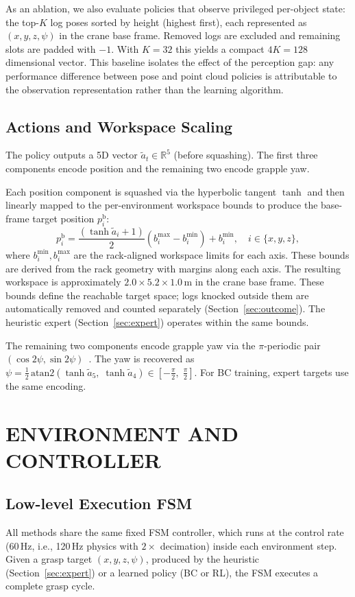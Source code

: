 \documentclass[letterpaper, 10 pt, conference]{ieeeconf}
\begin{document}
As an ablation, we also evaluate policies that observe privileged per-object state: the top-$K$ log poses sorted by height (highest first), each represented as $(x,y,z,\psi)$ in the crane base frame.
Removed logs are excluded and remaining slots are padded with $-1$.
With $K\!=\!32$ this yields a compact $4K = 128$ dimensional vector.
This baseline isolates the effect of the perception gap: any performance difference between pose and point cloud policies is attributable to the observation representation rather than the learning algorithm.

\subsection{Actions and Workspace Scaling}
\label{sec:actions}
The policy outputs a 5D vector $\tilde{a}_t \in \mathbb{R}^5$ (before squashing).
The first three components encode position and the remaining two encode grapple yaw.

Each position component is squashed via the hyperbolic tangent $\tanh$ and then linearly mapped to the per-environment workspace bounds to produce the base-frame target position $p^{\mathrm{b}}_i$:
\begin{equation}
    p^{\mathrm{b}}_i = \frac{(\tanh \tilde{a}_i + 1)}{2}(b_i^{\max} - b_i^{\min}) + b_i^{\min}, \quad i \in \{x,y,z\},
\end{equation}
where $b_i^{\min}, b_i^{\max}$ are the rack-aligned workspace limits for each axis.
These bounds are derived from the rack geometry with margins along each axis.
The resulting workspace is approximately $2.0 \times 5.2 \times 1.0$\,m in the crane base frame.
These bounds define the reachable target space; logs knocked outside them are automatically removed and counted separately (Section~\ref{sec:outcome}). The heuristic expert (Section~\ref{sec:expert}) operates within the same bounds.

The remaining two components encode grapple yaw via the $\pi$-periodic pair $(\cos 2\psi, \sin 2\psi)$~\cite{morrison2018closing}. The yaw is recovered as $\psi = \tfrac{1}{2}\,\mathrm{atan2}(\tanh \tilde{a}_5,\;\tanh \tilde{a}_4) \in [-\tfrac{\pi}{2},\;\tfrac{\pi}{2}]$.
For BC training, expert targets use the same encoding.

\section{ENVIRONMENT AND CONTROLLER}
\subsection{Low-level Execution FSM}
All methods share the same fixed FSM controller, which runs at the control rate (60\,Hz, i.e., 120\,Hz physics with $2\times$ decimation) inside each environment step.
Given a grasp target $(x,y,z,\psi)$, produced by the heuristic (Section~\ref{sec:expert}) or a learned policy (BC or RL), the FSM executes a complete grasp cycle.
\end{document}
